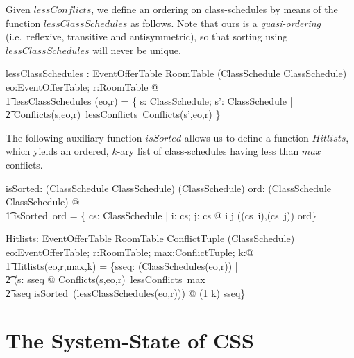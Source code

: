 \documentclass[a4paper]{article}
\begin{document}
Given $lessConflicts$, we define an ordering on class-schedules by means of the
function $lessClassSchedules$ as follows. Note that ours is a
\emph{quasi-ordering} (i.e.~reflexive, transitive and antisymmetric), so that
sorting using $lessClassSchedules$ will never be unique.
\begin{axdef}
  lessClassSchedules : EventOfferTable \cross RoomTable \fun (ClassSchedule \rel
  ClassSchedule) \\
  \where
  \forall eo:EventOfferTable; r:RoomTable @ \\
  \t1 lessClassSchedules (eo,r) = \{ s: ClassSchedule; s': ClassSchedule | \\
  \t2 Conflicts(s,eo,r)~lessConflicts~Conflicts(s',eo,r) \} \\
\end{axdef}

\noindent
The following auxiliary function $isSorted$ allows us to define a function
$Hitlists$, which yields an ordered, $k$-ary list of class-schedules having less
than $max$ conflicts.
\begin{axdef}
  isSorted: (ClassSchedule \rel ClassSchedule) \fun \power (\seq ClassSchedule) 
  \where
  \forall ord: (ClassSchedule \rel ClassSchedule) @ \\
  \t1 isSorted~ord = \{ cs: \seq ClassSchedule | \forall i: \dom cs; j: \dom cs
  @ i \leq j \implies ((cs~i),(cs~j)) \in ord\} \\
\end{axdef}
\begin{axdef}
  Hitlists: EventOfferTable \cross RoomTable \cross ConflictTuple \cross \nat
  \fun \power (\seq ClassSchedule) \\
  \where 
  \forall eo:EventOfferTable; r:RoomTable; max:ConflictTuple; k:\nat @ \\
  \t1 Hitlists(eo,r,max,k) = \{sseq: \seq (ClassSchedules(eo,r)) | \\
  \t2 (\forall s: \ran sseq @ Conflicts(s,eo,r)~lessConflicts~max \land \\
  \t2 sseq \in isSorted~(lessClassSchedules(eo,r))) @ (1 \upto k) \dres sseq\} \\
\end{axdef}



\section{The System-State of CSS}

\end{document}
